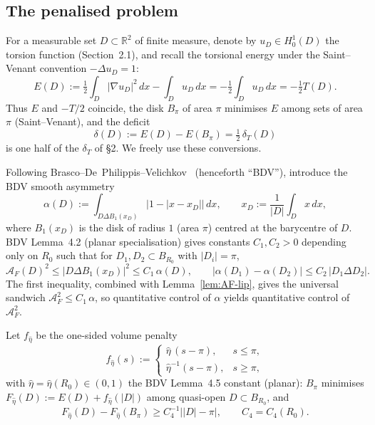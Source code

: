 \documentclass[11pt]{amsart}
\newcommand{\R}{\mathbb R}
\newcommand{\dT}{\delta_T}
\newcommand{\AF}{\mathcal A_F}
\begin{document}
\subsection{The penalised problem}\label{ss:penalised}

For a measurable set \(D\subset\R^2\) of finite measure, denote by
\(u_D\in H^1_0(D)\) the torsion function (Section~2.1), and recall the
torsional energy under the Saint--Venant convention
\(-\Delta u_D=1\):
\[
   E(D):=\tfrac12\int_D|\nabla u_D|^2\,dx-\int_D u_D\,dx
         =-\tfrac12\int_D u_D\,dx
         =-\tfrac12 T(D).
\]
Thus \(E\) and \(-T/2\) coincide, the disk \(B_\pi\) of area \(\pi\)
minimises \(E\) among sets of area \(\pi\) (Saint--Venant), and the
deficit
\[
   \delta(D):=E(D)-E(B_\pi)=\tfrac12\,\dT(D)
\]
is one half of the \(\dT\) of \S2.  We freely use these conversions.

Following Brasco--De~Philippis--Velichkov~\cite{BDV2015} (henceforth
``BDV''), introduce the BDV smooth asymmetry
\[
   \alpha(D):=\int_{D\Delta B_1(x_D)}\bigl|1-|x-x_D|\bigr|\,dx,
   \qquad x_D:=\frac{1}{|D|}\int_D x\,dx,
\]
where \(B_1(x_D)\) is the disk of radius \(1\) (area \(\pi\)) centred at
the barycentre of \(D\).  BDV Lemma~4.2 (planar specialisation)
gives constants \(C_1,C_2>0\) depending only on \(R_0\) such that for
\(D_1,D_2\subset B_{R_0}\) with \(|D_i|=\pi\),
\begin{equation}\label{eq:BDV-42}
   \AF(D)^2\le |D\Delta B_1(x_D)|^2\le C_1\,\alpha(D),
   \qquad
   |\alpha(D_1)-\alpha(D_2)|\le C_2\,|D_1\Delta D_2|.
\end{equation}
The first inequality, combined with Lemma~\ref{lem:AF-lip}, gives the
universal sandwich \(\AF^2\le C_1\,\alpha\), so quantitative control of
\(\alpha\) yields quantitative control of \(\AF^2\).

Let \(f_{\hat\eta}\) be the one-sided volume penalty
\[
   f_{\hat\eta}(s):=
   \begin{cases}
      \hat\eta\,(s-\pi),&s\le\pi,\\
      \hat\eta^{-1}(s-\pi),&s\ge\pi,
   \end{cases}
\]
with \(\hat\eta=\hat\eta(R_0)\in(0,1)\) the BDV Lemma~4.5 constant
(planar): \(B_\pi\) minimises
\(F_{\hat\eta}(D):=E(D)+f_{\hat\eta}(|D|)\) among quasi-open
\(D\subset B_{R_0}\), and
\begin{equation}\label{eq:Lem45}
   F_{\hat\eta}(D)-F_{\hat\eta}(B_\pi)
      \ge C_4^{-1}\bigl||D|-\pi\bigr|,
   \qquad C_4=C_4(R_0).
\end{equation}
\end{document}
